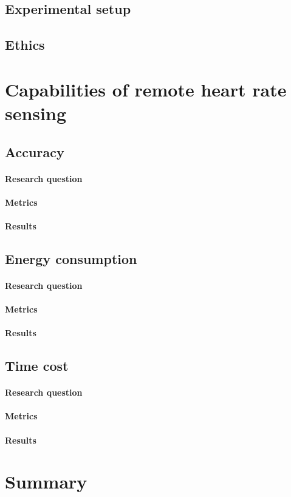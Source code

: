 \subsection{Experimental setup}
\subsection{Ethics}

\section{Capabilities of remote heart rate sensing}
\subsection{Accuracy}
\paragraph{Research question}
\paragraph{Metrics}
\paragraph{Results}

\subsection{Energy consumption}
\paragraph{Research question}
\paragraph{Metrics}
\paragraph{Results}

\subsection{Time cost}
\paragraph{Research question}
\paragraph{Metrics}
\paragraph{Results}

\section{Summary}